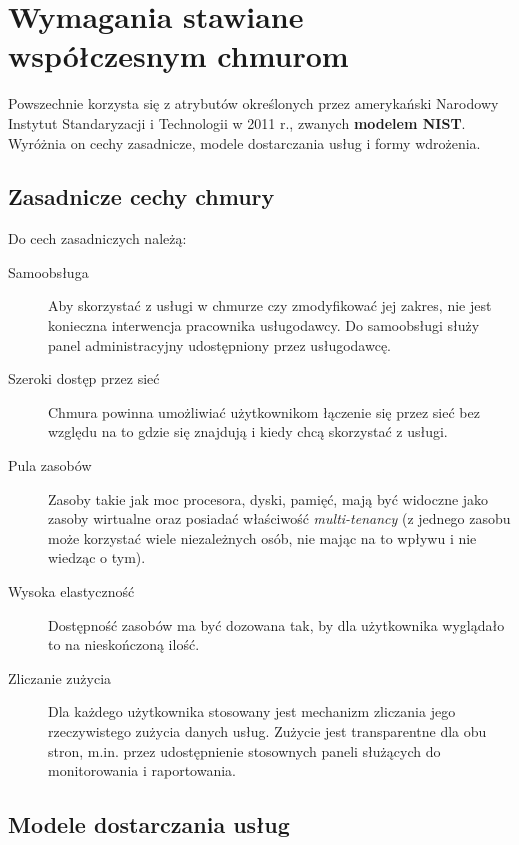 \documentclass[12pt,a4paper,twoside,titlepage,openright]{book}
\begin{document}
\section{Wymagania stawiane współczesnym chmurom}

Powszechnie korzysta się z atrybutów określonych przez amerykański Narodowy Instytut Standaryzacji i Technologii w 2011 r., zwanych \textbf{modelem NIST}. Wyróżnia on cechy zasadnicze, modele dostarczania usług i formy wdrożenia. \cite{ccCambridge, azurePackt, nistArticle}

\subsection{Zasadnicze cechy chmury}

Do cech zasadniczych należą:

\begin{description}
\item [Samoobsługa] Aby skorzystać z usługi w chmurze czy zmodyfikować jej zakres, nie jest konieczna interwencja pracownika usługodawcy. Do samoobsługi służy panel administracyjny udostępniony przez usługodawcę.
\item [Szeroki dostęp przez sieć] Chmura powinna umożliwiać użytkownikom łączenie się przez sieć bez względu na to gdzie się znajdują i kiedy chcą skorzystać z usługi.
\item [Pula zasobów] Zasoby takie jak moc procesora, dyski, pamięć, mają być widoczne jako zasoby wirtualne oraz posiadać właściwość \textit{multi-tenancy} (z jednego zasobu może korzystać wiele niezależnych osób, nie mając na to wpływu i nie wiedząc o tym).
\item [Wysoka elastyczność] Dostępność zasobów ma być dozowana tak, by dla użytkownika wyglądało to na nieskończoną ilość.
\item [Zliczanie zużycia] Dla każdego użytkownika stosowany jest mechanizm zliczania jego rzeczywistego zużycia danych usług. Zużycie jest transparentne dla obu stron, m.in. przez udostępnienie stosownych paneli służących do monitorowania i raportowania.
\end{description}

\subsection{Modele dostarczania usług}
\end{document}
